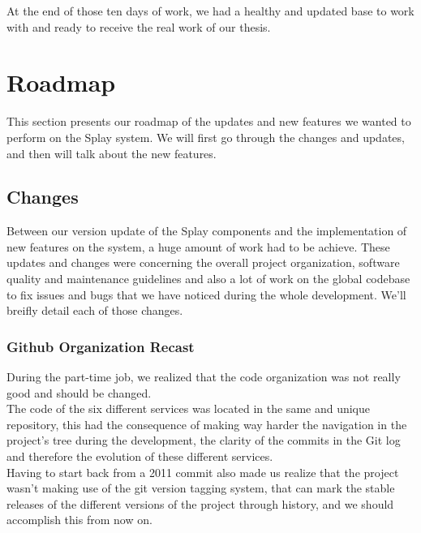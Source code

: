 \documentclass{eplmastersthesis}
\begin{document}
      At the end of those ten days of work, we had a healthy and updated
      base to work with and ready to receive the real work of our thesis.

    \section{Roadmap}

      This section presents our roadmap of the updates and new features
      we wanted to perform on the Splay system. We will first go through
      the changes and updates, and then will talk about the new features.

      \subsection{Changes}

        Between our version update of the Splay components and the
        implementation of new features on the system, a huge amount of
        work had to be achieve. These updates and changes were concerning
        the overall project organization, software quality and maintenance
        guidelines and also a lot of work on the global codebase to fix
        issues and bugs that we have noticed during the whole development.
        We'll breifly detail each of those changes.

        \subsubsection{Github Organization Recast}

          During the part-time job, we realized that the code organization
          was not really good and should be changed.\\
          The code of the six different services was located in the same and
          unique repository, this had the consequence of making way harder
          the navigation in the project's tree during the development, the
          clarity of the commits in the Git log and therefore the evolution
          of these different services.\\

          Having to start back from a 2011 commit also made us realize that the
          project wasn't making use of the git version tagging system, that
          can mark the stable releases of the different versions of the project
          through history, and we should accomplish this from now on.
\end{document}
